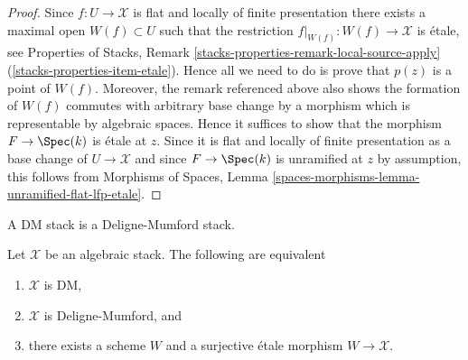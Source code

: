\begin{proof}
Since $f : U \to \mathcal{X}$ is flat and locally of finite presentation
there exists a maximal open $W(f) \subset U$ such that the restriction
$f|_{W(f)} : W(f) \to \mathcal{X}$ is \'etale, see
Properties of Stacks, Remark
\ref{stacks-properties-remark-local-source-apply}
(\ref{stacks-properties-item-etale}).
Hence all we need to do is prove that $p(z)$ is a point of $W(f)$.
Moreover, the remark referenced above also shows the formation of $W(f)$
commutes with arbitrary base change by a morphism which is representable
by algebraic spaces. Hence it suffices to show that the morphism
$F \to \Spec(k)$ is \'etale at $z$. Since it is flat and locally
of finite presentation as a base change of $U \to \mathcal{X}$ and since
$F \to \Spec(k)$ is unramified at $z$ by assumption, this follows
from
Morphisms of Spaces,
Lemma \ref{spaces-morphisms-lemma-unramified-flat-lfp-etale}.
\end{proof}

\noindent
A DM stack is a Deligne-Mumford stack.

\begin{theorem}
\label{theorem-DM}
Let $\mathcal{X}$ be an algebraic stack. The following are equivalent
\begin{enumerate}
\item $\mathcal{X}$ is DM,
\item $\mathcal{X}$ is Deligne-Mumford, and
\item there exists a scheme $W$ and a surjective \'etale
morphism $W \to \mathcal{X}$.
\end{enumerate}
\end{theorem}

